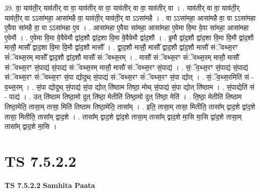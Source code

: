 \documentclass[17pt]{extarticle}
\begin{document}
39. वा॒ याव॑ती॒र् याव॑तीर् वा वा॒ याव॑तीर् वा वा॒ याव॑तीर् वा वा॒ याव॑तीर् वा । . याव॑तीर् वा वा॒ याव॑ती॒र् याव॑ती॒र् वा ऽऽसा॑महा॒ आसा॑महै वा॒ याव॑ती॒र् याव॑ती॒र् वा ऽऽसा॑महै । . वा ऽऽसा॑महा॒ आसा॑महै वा॒ वा ऽऽसा॑महा ए॒वैवा सा॑महै वा॒ वा ऽऽसा॑महा ए॒व । . आसा॑महा ए॒वैवा सा॑महा॒ आसा॑महा ए॒वेमा वि॒मा वे॒वा सा॑महा॒ आसा॑महा ए॒वेमौ । . ए॒वेमा वि॒मा वे॒वैवेमौ द्वा॑द॒शौ द्वा॑द॒शा वि॒मा वे॒वैवेमौ द्वा॑द॒शौ । . इ॒मौ द्वा॑द॒शौ द्वा॑द॒शा वि॒मा वि॒मौ द्वा॑द॒शौ मासौ॒ मासौ᳚ द्वाद॒शा वि॒मा वि॒मौ द्वा॑द॒शौ मासौ᳚ । . द्वा॒द॒शौ मासौ॒ मासौ᳚ द्वाद॒शौ द्वा॑द॒शौ मासौ॑ संॅवथ्स॒रꣳ सं॑ॅवथ्स॒रम् मासौ᳚ द्वाद॒शौ द्वा॑द॒शौ मासौ॑ संॅवथ्स॒रम् । . मासौ॑ संॅवथ्स॒रꣳ सं॑ॅवथ्स॒रम् मासौ॒ मासौ॑ संॅवथ्स॒रꣳ सं॒पाद्य॑ सं॒पाद्य॑ संॅवथ्स॒रम् मासौ॒ मासौ॑ संॅवथ्स॒रꣳ सं॒पाद्य॑ । . सं॒ॅव॒थ्स॒रꣳ सं॒पाद्य॑ सं॒पाद्य॑ संॅवथ्स॒रꣳ सं॑ॅवथ्स॒रꣳ सं॒पा द्योदुथ् सं॒पाद्य॑ संॅवथ्स॒रꣳ सं॑ॅवथ्स॒रꣳ सं॒पा द्योत् । . सं॒ॅव॒थ्स॒रमिति॑ सं - व॒थ्स॒रम् । . सं॒पा द्योदुथ् सं॒पाद्य॑ सं॒पा द्योत् ति॑ष्ठाम तिष्ठा॒ मोथ् सं॒पाद्य॑ सं॒पा द्योत् ति॑ष्ठाम । . सं॒पाद्येति॑ सं - पाद्य॑ । . उत् ति॑ष्ठाम तिष्ठा॒मो दुत् ति॑ष्ठा॒ मेतीति॑ तिष्ठा॒मो दुत् ति॑ष्ठा॒ मेति॑ । . ति॒ष्ठा॒ मेतीति॑ तिष्ठाम तिष्ठा॒मेति॒ तासा॒म् तासा॒ मिति॑ तिष्ठाम तिष्ठा॒मेति॒ तासा᳚म् । . इति॒ तासा॒म् तासा॒ मितीति॒ तासा᳚म् द्वाद॒शे द्वा॑द॒शे तासा॒ मितीति॒ तासा᳚म् द्वाद॒शे । . तासा᳚म् द्वाद॒शे द्वा॑द॒शे तासा॒म् तासा᳚म् द्वाद॒शे मा॒सि मा॒सि द्वा॑द॒शे तासा॒म् तासा᳚म् द्वाद॒शे मा॒सि । \newline
\pagebreak
{}

\section{ TS 7.5.2.2 }

\textbf{TS 7.5.2.2 } \newline
\textbf{Samhita Paata} \newline
\end{document}

